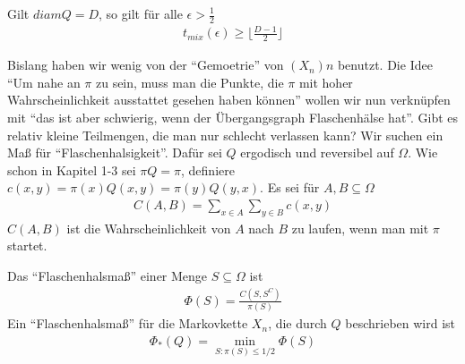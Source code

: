 \begin{satz}
	Gilt $diam Q = D$, so gilt für alle $\epsilon > \frac{1}{2}$
	\begin{align}
		t_{mix}(\epsilon) \geq \lfloor\frac{D-1}{2}\rfloor
	\end{align}
\end{satz}

Bislang haben wir wenig von der \enquote{Gemoetrie} von $(X_n)n$ benutzt. Die Idee \enquote{Um nahe an $\pi$ zu sein, muss man die Punkte, die $\pi$ mit hoher Wahrscheinlichkeit ausstattet gesehen haben können} wollen wir nun verknüpfen mit \enquote{das ist aber schwierig, wenn der Übergangsgraph Flaschenhälse hat}. Gibt es relativ kleine Teilmengen, die man nur schlecht verlassen kann? Wir suchen ein Maß für \enquote{Flaschenhalsigkeit}. Dafür sei $Q$ ergodisch und reversibel auf $\Omega$. Wie schon in Kapitel 1-3  sei $\pi Q = \pi$, definiere $c(x,y) = \pi(x) Q(x,y) = \pi(y) Q(y,x).$ Es sei für $A,B \subseteq \Omega$
\begin{align}
	C(A,B) = \sum\limits_{x\in A} \sum\limits_{y \in B} c(x,y)
\end{align}
$C(A,B)$ ist die Wahrscheinlichkeit von $A$ nach $B$ zu laufen, wenn man mit $\pi$ startet. 
\begin{definition}
	Das \enquote{Flaschenhalsmaß} einer Menge $S \subseteq \Omega$ ist
	\begin{align}
		\Phi(S) = \frac{C(S,S^C)}{\pi(S)}
	\end{align}
	Ein \enquote{Flaschenhalsmaß} für die Markovkette $X_n$, die durch $Q$ beschrieben wird ist 
	\begin{align}
		\Phi_*(Q) = \min\limits_{S:\pi(S)\leq 1/2} \Phi(S)
	\end{align}
\end{definition}
